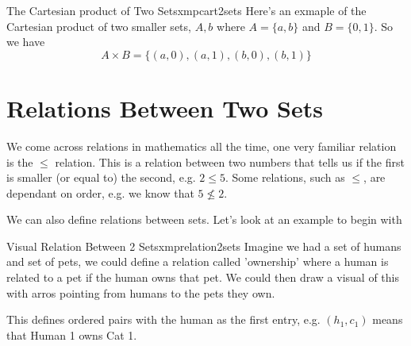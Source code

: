 \vspace{1cm}

\begin{exmpl}[label={exmpl: cart2sets}]{The Cartesian product of Two Sets}{xmpcart2sets}
    Here's an exmaple of the Cartesian product of two smaller sets, $A,b$ where $A = \{a,b\}$ and $B = \{0,1\}$. So we have
    $$A \times B = \{(a,0), (a,1),(b,0),(b,1) \}$$
\end{exmpl}
\newpage
\section{Relations Between Two Sets}
We come across relations in mathematics all the time, one very familiar relation is the $\leq$ relation. This is a relation between two numbers that tells us if the first is smaller (or equal to) the second, e.g. $2 \leq 5$. Some relations, such as $\leq$, are dependant on order, e.g. we know that $5 \not\leq 2$.

We can also define relations between sets. Let's look at an example to begin with

\begin{exmpl}[label={exmpl: relation2sets}]{Visual Relation Between 2 Sets}{xmprelation2sets}
    Imagine we had a set of humans and set of pets, we could define a relation called 'ownership' where a human is related to a pet if the human owns that pet. We could then draw a visual of this with arros pointing from humans to the pets they own.
    \begin{center}
    \end{center}
    This defines ordered pairs with the human as the first entry, e.g. $(h_1, c_1)$ means that Human 1 owns Cat 1.
\end{exmpl}


